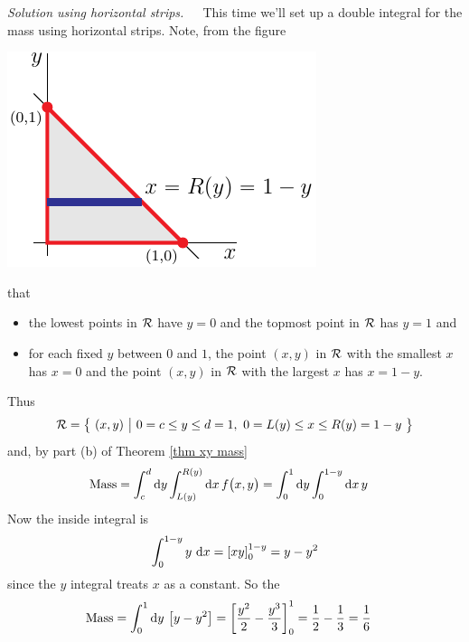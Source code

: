 \begin{eg}
\medskip\noindent\emph{Solution using horizontal strips.}\ \ \
This time we'll set up a double integral for the mass using horizontal strips.  
Note, from the figure 
\begin{efig}
\begin{center}
   \includegraphics{dblInt0c.pdf}
\end{center}
\end{efig}
that
\begin{itemize}
\item
the lowest points in $\mathcal{R}$ have $y=0$ and the topmost point
in $\mathcal{R}$ has $y=1$ and
\item 
for each fixed $y$ between $0$ and $1$, the point $(x,y)$ in $\mathcal{R}$
with the smallest $x$ has $x=0$ and the point $(x,y)$ in $\mathcal{R}$
with the largest $x$ has $x=1-y$.
\end{itemize}
Thus
\begin{equation*}
\cR=\Set{(x,y)}{0=c\le y\le d=1,\ 
        0= L(y)\le x\le R(y) = 1-y}
\end{equation*}
and, by part (b) of Theorem  \ref{thm xy mass}
\begin{align*}
\text{Mass} &= \int_c^d \mathrm{d}y \int_{L(y)}^{R(y)} \mathrm{d}x\, f\big(x,y\big) 
        = \int_0^1 \mathrm{d}y \int_0^{1-y} \mathrm{d}x\, y 
\end{align*}
Now the inside integral is
\begin{align*}
\int_0^{1-y}  y \ \mathrm{d}x
=\left[ xy \right]_0^{1-y}
=y-y^2
\end{align*}
since the $y$ integral treats $x$ as a constant.
So the
\begin{align*}
\text{Mass} &= \int_0^1 \mathrm{d}y\  \big[y-y^2\big]
        =\left[\frac{y^2}{2}-\frac{y^3}{3}\right]_0^1 
        = \frac{1}{2}-\frac{1}{3}
        =\frac{1}{6}
\end{align*} 
\end{eg}


